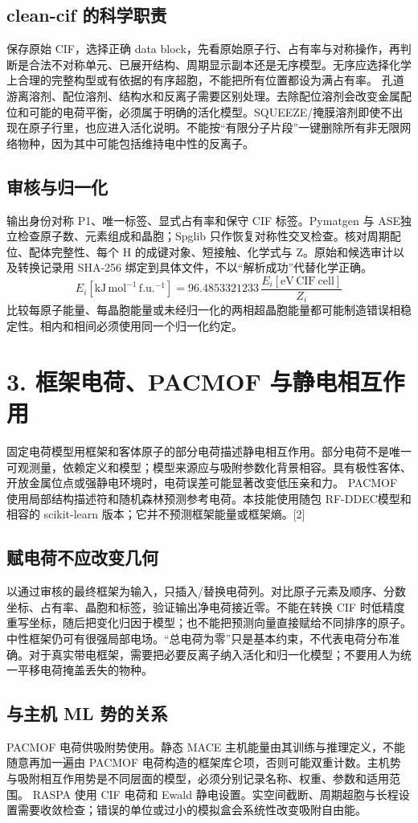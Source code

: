 \documentclass[UTF8,a4paper,11pt]{ctexart}
\begin{document}
\subsection*{clean-cif 的科学职责}
保存原始 CIF，选择正确 data block，先看原始原子行、占有率与对称操作，再判断是合法不对称单元、已展开结构、周期显示副本还是无序模型。无序应选择化学上合理的完整构型或有依据的有序超胞，不能把所有位置都设为满占有率。
孔道游离溶剂、配位溶剂、结构水和反离子需要区别处理。去除配位溶剂会改变金属配位和可能的电荷平衡，必须属于明确的活化模型。SQUEEZE/掩膜溶剂即使不出现在原子行里，也应进入活化说明。不能按“有限分子片段”一键删除所有非无限网络物种，因为其中可能包括维持电中性的反离子。
\subsection*{审核与归一化}
输出身份对称 P1、唯一标签、显式占有率和保守 CIF 标签。Pymatgen 与 ASE独立检查原子数、元素组成和晶胞；Spglib 只作恢复对称性交叉检查。核对周期配位、配体完整性、每个 H 的成键对象、短接触、化学式与 Z。原始和候选审计以及转换记录用 SHA-256 绑定到具体文件，不以“解析成功”代替化学正确。
\begin{equation*}
E_i[\mathrm{kJ\,mol^{-1}\,f.u.^{-1}}]=96.4853321233\,\frac{E_i[\mathrm{eV\,CIF\ cell}]}{Z_i}
\end{equation*}
比较每原子能量、每晶胞能量或未经归一化的两相超晶胞能量都可能制造错误相稳定性。相内和相间必须使用同一个归一化约定。
\clearpage
\section*{3. 框架电荷、PACMOF 与静电相互作用}
固定电荷模型用框架和客体原子的部分电荷描述静电相互作用。部分电荷不是唯一可观测量，依赖定义和模型；模型来源应与吸附参数化背景相容。具有极性客体、开放金属位点或强静电环境时，电荷误差可能显著改变低压亲和力。
PACMOF 使用局部结构描述符和随机森林预测参考电荷。本技能使用随包 RF-DDEC模型和相容的 scikit-learn 版本；它并不预测框架能量或框架熵。[2]
\subsection*{赋电荷不应改变几何}
以通过审核的最终框架为输入，只插入/替换电荷列。对比原子元素及顺序、分数坐标、占有率、晶胞和标签，验证输出净电荷接近零。不能在转换 CIF 时低精度重写坐标，随后把变化归因于模型；也不能把预测向量直接赋给不同排序的原子。
中性框架仍可有很强局部电场。“总电荷为零”只是基本约束，不代表电荷分布准确。对于真实带电框架，需要把必要反离子纳入活化和归一化模型；不要用人为统一平移电荷掩盖丢失的物种。
\subsection*{与主机 ML 势的关系}
PACMOF 电荷供吸附势使用。静态 MACE 主机能量由其训练与推理定义，不能随意再加一遍由 PACMOF 电荷构造的框架库仑项，否则可能双重计数。主机势与吸附相互作用势是不同层面的模型，必须分别记录名称、权重、参数和适用范围。
RASPA 使用 CIF 电荷和 Ewald 静电设置。实空间截断、周期超胞与长程设置需要收敛检查；错误的单位或过小的模拟盒会系统性改变吸附自由能。
\clearpage
\end{document}
